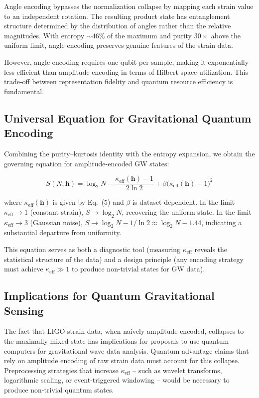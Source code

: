 \documentclass[conference]{IEEEtran}
\begin{document}
Angle encoding bypasses the normalization collapse by mapping each strain value to an independent rotation. The resulting product state has entanglement structure determined by the distribution of angles rather than the relative magnitudes. With entropy $\sim 46\%$ of the maximum and purity $30\times$ above the uniform limit, angle encoding preserves genuine features of the strain data.

However, angle encoding requires one qubit per sample, making it exponentially less efficient than amplitude encoding in terms of Hilbert space utilization. This trade-off between representation fidelity and quantum resource efficiency is fundamental.

\subsection{Universal Equation for Gravitational Quantum Encoding}

Combining the purity--kurtosis identity with the entropy expansion, we obtain the governing equation for amplitude-encoded GW states:

\begin{equation}
\boxed{S(N, \mathbf{h}) = \log_2 N - \frac{\kappa_{\text{eff}}(\mathbf{h}) - 1}{2 \ln 2} + \beta \big(\kappa_{\text{eff}}(\mathbf{h}) - 1\big)^2}
\end{equation}

where $\kappa_{\text{eff}}(\mathbf{h})$ is given by Eq.~(5) and $\beta$ is dataset-dependent. In the limit $\kappa_{\text{eff}} \to 1$ (constant strain), $S \to \log_2 N$, recovering the uniform state. In the limit $\kappa_{\text{eff}} \to 3$ (Gaussian noise), $S \to \log_2 N - 1/\ln 2 \approx \log_2 N - 1.44$, indicating a substantial departure from uniformity.

This equation serves as both a diagnostic tool (measuring $\kappa_{\text{eff}}$ reveals the statistical structure of the data) and a design principle (any encoding strategy must achieve $\kappa_{\text{eff}} \gg 1$ to produce non-trivial states for GW data).

\subsection{Implications for Quantum Gravitational Sensing}

The fact that LIGO strain data, when naively amplitude-encoded, collapses to the maximally mixed state has implications for proposals to use quantum computers for gravitational wave data analysis. Quantum advantage claims that rely on amplitude encoding of raw strain data must account for this collapse. Preprocessing strategies that increase $\kappa_{\text{eff}}$ -- such as wavelet transforms, logarithmic scaling, or event-triggered windowing -- would be necessary to produce non-trivial quantum states.
\end{document}
